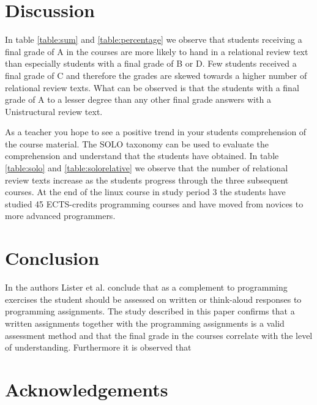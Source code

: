 \documentclass[twoside,twocolumn,a4paper,11pt,english]{article}
\begin{document}

\section{Discussion}

In table \ref{table:sum} and \ref{table:percentage}
we observe that students receiving a final grade of A in the courses are more likely to hand in a relational review text than especially students with a final grade of B or D. Few students received a final grade of C and therefore the grades are skewed towards a higher number of relational review texts. What can be observed is that the students with a final grade of A to a lesser degree than any other final grade answers with a Unistructural review text.

As a teacher you hope to see a positive trend in your students comprehension of the course material. The SOLO taxonomy can be used to evaluate the comprehension and understand that the students have obtained. In table \ref{table:solo} and \ref{table:solorelative} we observe that the number of relational review texts increase as the students progress through the three subsequent courses. At the end of the linux course in study period 3 the students have studied 45 ECTS-credits programming courses and have moved from novices to more advanced programmers.




\section{Conclusion}

In \cite{lister2006not} the authors Lister et al. conclude that as a complement to programming exercises the student should be assessed on written or think-aloud responses to programming assignments. The study described in this paper confirms that a written assignments together with the programming assignments is a valid assessment method and that the final grade in the courses correlate with the level of understanding. Furthermore it is observed that




\section{Acknowledgements}
\end{document}
